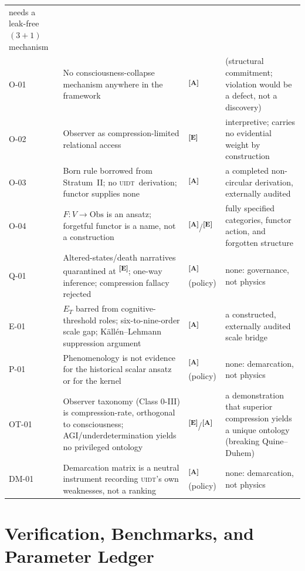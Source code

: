 \documentclass[12pt,a4paper,twoside]{article}
\theoremstyle{plain}
\theoremstyle{definition}
\theoremstyle{remark}
\newcommand{\UIDT}{\textsc{uidt}}
\newcommand{\catmark}[1]{\textsuperscript{\textsf{\textbf{[#1]}}}}
\begin{document}
{\begin{longtable}{@{}p{}p{}p{}p{}@{}}
needs a leak-free $(3{+}1)$ mechanism \\
O-01 & No consciousness-collapse mechanism anywhere in the framework &
\catmark{A} & (structural commitment; violation would be a defect, not
a discovery) \\
O-02 & Observer as compression-limited relational access & \catmark{E}
& interpretive; carries no evidential weight by construction \\
O-03 & Born rule borrowed from Stratum~II; no \UIDT\ derivation;
functor supplies none & \catmark{A} & a completed non-circular
derivation, externally audited \\
O-04 & $F\colon V\to\mathrm{Obs}$ is an ansatz; forgetful functor is a
name, not a construction & \catmark{A}/\catmark{E} & fully specified
categories, functor action, and forgotten structure \\
Q-01 & Altered-states/death narratives quarantined at \catmark{E};
one-way inference; compression fallacy rejected & \catmark{A} (policy)
& none: governance, not physics \\
E-01 & $E_T$ barred from cognitive-threshold roles; six-to-nine-order
scale gap; K\"all\'en--Lehmann suppression argument &
\catmark{A} & a constructed, externally audited scale bridge \\
P-01 & Phenomenology is not evidence for the historical scalar ansatz or for the kernel &
\catmark{A} (policy) & none: demarcation, not physics \\
OT-01 & Observer taxonomy (Class 0-III) is compression-rate, orthogonal to
consciousness; AGI/underdetermination yields no privileged ontology &
\catmark{E}/\catmark{A} & a demonstration that superior compression yields
a unique ontology (breaking Quine--Duhem) \\
DM-01 & Demarcation matrix is a neutral instrument recording \UIDT's own
weaknesses, not a ranking & \catmark{A} (policy) & none: demarcation, not
physics \\
\end{longtable}
}



\newpage
\part{Verification, Benchmarks, and Parameter Ledger}
\label{part:effective-field}
\end{document}
